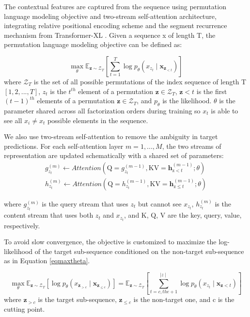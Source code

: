 \documentclass[runningheads]{llncs}
\begin{document}
The contextual features are captured from the sequence using permutation language modeling objective and two-stream self-attention architecture, integrating relative positional encoding scheme and the segment recurrence mechanism from Transformer-XL \cite{yang2019xlnet}. Given a sequence x of length T, the permutation language modeling objective can be defined as: 

\begin{equation}
\max _{\theta} \mathbb{E}_{\mathbf{z} \sim \mathcal{Z}_{T}}\left[\sum_{t=1}^{T} \log p_{\theta}\left(x_{z_{t}} \mid \mathbf{x}_{\mathbf{z}_{<t}}\right)\right]
\end{equation}
where $\mathcal{Z}_{T}$ is the set of all possible permutations of the index sequence of length T 
$[1, 2, . . . , T]$, $z_{t}$ is the $t^{th}$ element of a permutation $\mathbf{z} \in \mathcal{Z}_{T}$,  $\mathbf{z}<t$ is the first $(t - 1)^{th}$ elements of a permutation $\mathbf{z} \in \mathcal{Z}_{T}$, and  $p_{\theta}$ is the likelihood. $\theta$ is the parameter shared across all factorization orders during training so $x_{t}$ is able to see all $x_{i} \neq x_{t}$ possible elements in the sequence.

We also use two-stream self-attention to remove the ambiguity in target predictions. For each self-attention layer  $m = 1, ... , M$, the two streams of representation are updated schematically with a shared set of parameters:
\begin{equation}
\label{eqhztm}
\begin{array}{l}
g_{z_{t}}^{(m)} \leftarrow Attention \left(\mathrm{Q}=g_{z_{t}}^{(m-1)}, \mathrm{KV}=\mathbf{h}_{\mathrm{z}<t}^{(m-1)} ; \theta\right) \\
h_{z_{t}}^{(m)} \leftarrow Attention \left(\mathrm{Q}=h_{z_{t}}^{(m-1)}, \mathrm{KV}=\mathbf{h}_{\mathrm{z} \leq t}^{(m-1)} ; \theta\right)
\end{array}
\end{equation}

where  $g_{z_{t}}^{(m)}$ is the query stream that uses $z_t$ but cannot see $x_{z_t}$, $h_{z_{t}}^{(m)}$ is the content stream that uses both $z_t$ and $x_{z_t}$, and K, Q, V are the key, query, value, respectively.

To avoid slow convergence,  the objective is customized to maximize the log-likelihood of the target sub-sequence conditioned on the non-target sub-sequence as in Equation \ref{eqmaxtheta}.

{\small
\begin{equation}
\label{eqmaxtheta}
\max _{\theta} \mathbb{E}_{\mathbf{z} \sim \mathcal{Z}_{T}}\left[ \log p_{\theta}\left(x_{\mathbf{z}_{> c}} \mid \mathbf{x}_{\mathbf{z}_{\leq c}}\right)\right]    =   \mathbb{E}_{\mathbf{z} \sim \mathcal{Z}_{T}}\left[\sum_{t = c , the+ 1}^{\mid z \mid} \log p_{\theta}\left(x_{z_{t}} \mid \mathbf{x}_{\mathbf{z}<t}\right)\right]
\end{equation}
}
where $\mathbf{z}_{> c}$ is the target sub-sequence, $\mathbf{z}_{\leq c}$ is the non-target one, and c is the cutting point.
\end{document}
